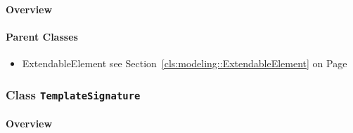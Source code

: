 \paragraph{Overview}


\paragraph{Parent Classes}
\begin{itemize}
\item ExtendableElement see Section~\ref{cls:modeling::ExtendableElement} on Page~\pageref{cls:modeling::ExtendableElement}\end{itemize}
\subsubsection{\Large{Class \bfseries \texttt{TemplateSignature}\normalfont}}
\label{cls:modeling::templates::TemplateSignature} 
\paragraph{Overview}

\newpage
